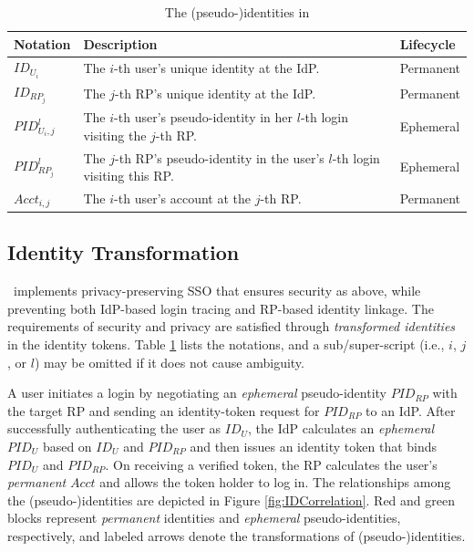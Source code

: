 \begin{table}[t]
\footnotesize
    \caption{The (pseudo-)identities in \usso}
    \centering
    \begin{tabular}{|l|p{5.215cm}|l|} \hline
    {\textbf{Notation}} & {\textbf{Description}} & {\textbf{Lifecycle}} \\ \hline
    {$ID_{U_i}$} & {The $i$-th user's unique identity at the IdP.} & {Permanent} \\ \hline
    {$ID_{RP_j}$} & {The $j$-th RP's unique identity at the IdP.} & {Permanent} \\ \hline
    {$PID_{U_i,j}^l$} & {The $i$-th user's pseudo-identity in her $l$-th login visiting the $j$-th RP.} & {Ephemeral} \\ \hline
    {$PID_{RP_j}^l$} & {The $j$-th RP's pseudo-identity in the user's $l$-th login visiting this RP.} & {Ephemeral} \\ \hline
    {$Acct_{i,j}$} & {The $i$-th user's account at the $j$-th RP.} & {Permanent} \\ \hline
    \end{tabular}
    \label{tbl:notations-dilemma}
\end{table}


\subsection{Identity Transformation}
\label{subsec:solutions}

\usso\ implements privacy-preserving SSO that ensures security as above, while preventing both IdP-based login tracing and RP-based identity linkage.
The requirements of security and privacy are satisfied through \emph{transformed identities} in the identity tokens. Table \ref{tbl:notations-dilemma} lists the notations,
and a sub/super-script (i.e., $i$, $j$, or $l$) may be omitted if it does not cause ambiguity.


A user initiates a login by negotiating an \emph{ephemeral} pseudo-identity $PID_{RP}$  with the target RP and sending an identity-token request for $PID_{RP}$ to an IdP.
After successfully authenticating the user as $ID_U$, the IdP calculates an \emph{ephemeral} $PID_U$ based on $ID_U$ and $PID_{RP}$ and then issues an identity token that binds $PID_U$ and $PID_{RP}$.
On receiving a verified token, the RP calculates the user's \emph{permanent} $Acct$ and allows the token holder to log in.
The relationships among the (pseudo-)identities are depicted in Figure \ref{fig:IDCorrelation}.
Red and green blocks represent \emph{permanent} identities and \emph{ephemeral} pseudo-identities, respectively, and 
labeled arrows denote the transformations of (pseudo-)identities.

